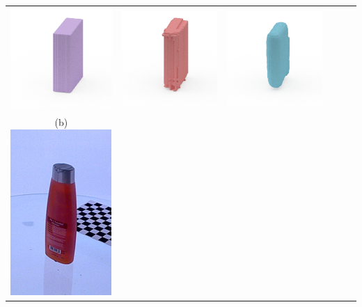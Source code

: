 \documentclass[10pt,onecolumn,letterpaper]{article}
\begin{document}
\begin{tabular}{cccccc}
\includegraphics[height=\turnheight, clip=true, trim=60 30 30 5]{ritz_crackers_NP3_0_bb_view_180.png} &
\includegraphics[height=\turnheight, clip=true, trim=60 30 30 5]{ritz_crackers_NP3_0_zheng_view_180.png} &
\includegraphics[height=\turnheight, clip=true, trim=60 30 30 5]{ritz_crackers_NP3_0_oma_view_180} \\
(b) \includegraphics[height=\turnheight, clip=true, trim=20 30 30 5]{vo5_extra_body_volumizing_shampoo.png} &

\end{tabular}
\end{document}
